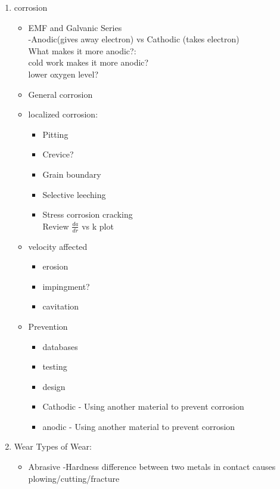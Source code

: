 \documentclass[11pt]{article}
\begin{document}
\begin{enumerate}
\begin{itemize}
    \end{itemize}
    \item corrosion
    \begin{itemize}
        \item EMF and Galvanic Series
        \\
        -Anodic(gives away electron) vs Cathodic (takes electron)
        \\
        What makes it more anodic?:
        \\
            cold work makes it more anodic?
        \\
            lower oxygen level?
        \item General corrosion
        \item localized corrosion:
        \begin{itemize}
            \item Pitting
            \item Crevice?
            \item Grain boundary
            \item Selective leeching
            \item Stress corrosion cracking
            \\
            Review $\frac{da}{dr}$ vs k plot
        \end{itemize}
        \item velocity affected
        \begin{itemize}
            \item erosion
            \item impingment?
            \item cavitation
        \end{itemize}
        \item Prevention
        \begin{itemize}
            \item databases
            \item testing
            \item design
            \item Cathodic - Using another material to prevent corrosion
            \item anodic - Using another material to prevent corrosion
        \end{itemize}
    \end{itemize}
    \item Wear
    Types of Wear:
    \begin{itemize}
        \item Abrasive
        -Hardness difference between two metals in contact causes plowing/cutting/fracture
        

\end{itemize}
\end{enumerate}
\end{document}
